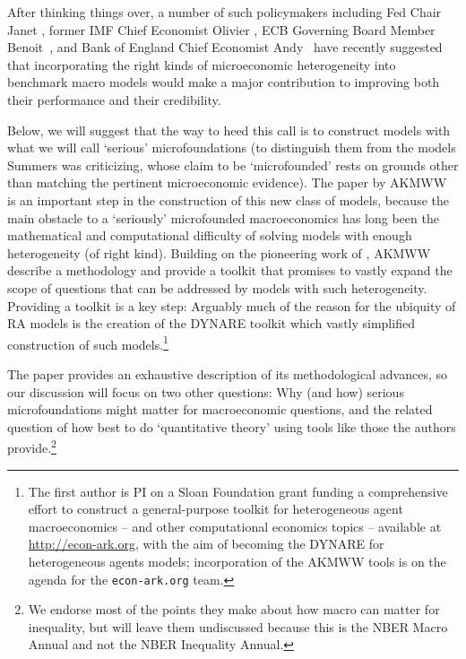 \documentclass[titlepage]{econtex}
\begin{document}
After thinking things over, a number of such policymakers including Fed Chair Janet \cite{yellenHetero}, former IMF Chief Economist Olivier \cite{blanchardDSGE}, ECB Governing Board Member Benoit~\cite{coeureHetero}, and Bank of England Chief Economist Andy~\cite{haldaneDappled} have recently suggested that incorporating the right kinds of microeconomic heterogeneity into benchmark macro models would make a major contribution to improving both their performance and their credibility.  

Below, we will suggest that the way to heed this call is to construct models with what we will call `serious' microfoundations (to distinguish them from the models Summers was criticizing, whose claim to be `microfounded' rests on grounds other than matching the pertinent microeconomic evidence).  The paper by AKMWW is an important step in the construction of this new class of models, because the main obstacle to a `seriously' microfounded macroeconomics has long been the mathematical and computational difficulty of solving models with enough heterogeneity (of right kind).  Building on the pioneering work of \cite{reiterSolving,reiterApproximate}, AKMWW describe a methodology and provide a toolkit that promises to vastly expand the scope of questions that can be addressed by models with such heterogeneity.  Providing a toolkit is a key step: Arguably much of the reason for the ubiquity of RA models is the creation of the DYNARE toolkit which vastly simplified construction of such models.\footnote{The first author is PI on a Sloan Foundation grant funding a comprehensive effort to construct a general-purpose toolkit for heterogeneous agent macroeconomics -- and other computational economics topics -- available at \href{econ-ark.org}{http://econ-ark.org}, with the aim of becoming the DYNARE for heterogeneous agents models; incorporation of the AKMWW tools is on the agenda for the \texttt{econ-ark.org} team.}
\hypertarget{SeriousHeterogeneity}{}

The paper provides an exhaustive description of its methodological advances, so our discussion will focus on two other questions: Why (and how) serious microfoundations might matter for macroeconomic questions, and the related question of how best to do `quantitative theory' using tools like those the authors provide.\footnote{We endorse  most of the points they make about how macro can matter for inequality, but will leave them undiscussed because this is the NBER Macro Annual and not the NBER Inequality Annual.}
\end{document}
